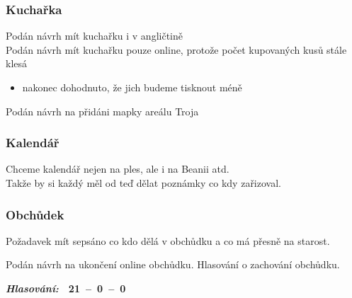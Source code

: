 \documentclass[10pt,a4paper]{report}
\newcommand{\hlas}[3]{
  \begin{flushright}
  {\it\bfseries Hlasování:\/}\ \ {\bfseries #1\ --\ #2\ --\ #3}
  \end{flushright}
}
\begin{document}
\subsubsection{Kuchařka}
Podán návrh mít kuchařku i v angličtině\\
Podán návrh mít kuchařku pouze online, protože počet kupovaných kusů stále klesá
\begin{itemize}
  \item nakonec dohodnuto, že jich budeme tisknout méně 
\end{itemize}
Podán návrh na přidáni mapky areálu Troja\\

\subsubsection{Kalendář}
Chceme kalendář nejen na ples, ale i na Beanii atd.\\
Takže by si každý měl od teď dělat poznámky co kdy zařizoval.

\subsubsection{Obchůdek}
Požadavek mít sepsáno co kdo dělá v obchůdku a co má přesně na starost.

Podán návrh na ukončení online obchůdku. Hlasování o zachování obchůdku.
\hlas{21}{0}{0}
\end{document}
